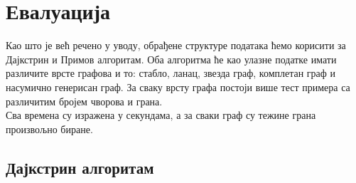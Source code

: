 \documentclass[11pt, a4paper]{article}
\theoremstyle{remark}
\numberwithin{equation}{section}
\begin{document}
	\newpage
	\section{Евалуација}
	Као што је већ речено у уводу, обрађене структуре података ћемо корисити за Дајкстрин и Примов алгоритам. Оба алгоритма ће као улазне податке имати различите врсте графова и то: стабло, ланац, звезда граф, комплетан граф и насумично генерисан граф. За сваку врсту графа постоји више тест примера са различитим бројем чворова и грана. \\
	
	\noindent Сва времена су изражена у секундама, а за сваки граф су тежине грана произвољно биране.
	
	\subsection{Дајкстрин алгоритам}
	
\end{document}
